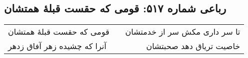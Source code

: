 \begin{center}
\section*{رباعی شماره ۵۱۷: قومی که حقست قبلهٔ همتشان}
\label{sec:sh517}
\begin{longtable}{l p{0.5cm} r}
قومی که حقست قبلهٔ همتشان
&&
تا سر داری مکش سر از خدمتشان
\\
آنرا که چشیده زهر آفاق زدهر
&&
خاصیت تریاق دهد صحبتشان
\\
\end{longtable}
\end{center}
